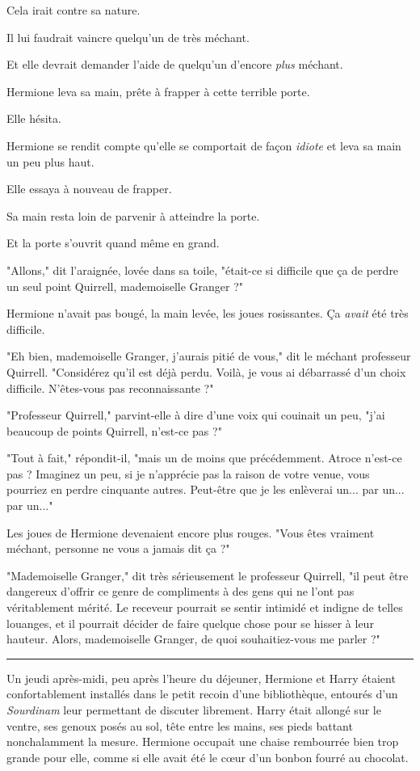 Cela irait contre sa nature.

Il lui faudrait vaincre quelqu'un de très méchant.

Et elle devrait demander l'aide de quelqu'un d'encore \emph{plus}  méchant.

Hermione leva sa main, prête à frapper à cette terrible porte.

Elle hésita.

Hermione se rendit compte qu'elle se comportait de façon \emph{idiote}  et leva sa main un peu plus haut.

Elle essaya à nouveau de frapper.

Sa main resta loin de parvenir à atteindre la porte.

Et la porte s'ouvrit quand même en grand.

"Allons," dit l'araignée, lovée dans sa toile, "était-ce si difficile que ça de perdre un seul point Quirrell, mademoiselle Granger ?"

Hermione n'avait pas bougé, la main levée, les joues rosissantes. Ça \emph{avait}  été très difficile.

"Eh bien, mademoiselle Granger, j'aurais pitié de vous," dit le méchant professeur Quirrell. "Considérez qu'il est déjà perdu. Voilà, je vous ai débarrassé d'un choix difficile. N'êtes-vous pas reconnaissante ?"

"Professeur Quirrell," parvint-elle à dire d'une voix qui couinait un peu, "j'ai beaucoup de points Quirrell, n'est-ce pas ?"

"Tout à fait," répondit-il, "mais un de moins que précédemment. Atroce n'est-ce pas ? Imaginez un peu, si je n'apprécie pas la raison de votre venue, vous pourriez en perdre cinquante autres. Peut-être que je les enlèverai un... par un... par un..."

Les joues de Hermione devenaient encore plus rouges. "Vous êtes vraiment méchant, personne ne vous a jamais dit ça ?"

"Mademoiselle Granger," dit très sérieusement le professeur Quirrell, "il peut être dangereux d'offrir ce genre de compliments à des gens qui ne l'ont pas véritablement mérité. Le receveur pourrait se sentir intimidé et indigne de telles louanges, et il pourrait décider de faire quelque chose pour se hisser à leur hauteur. Alors, mademoiselle Granger, de quoi souhaitiez-vous me parler ?"
\par\noindent\rule{\textwidth}{0.4pt}
Un jeudi après-midi, peu après l'heure du déjeuner, Hermione et Harry étaient confortablement installés dans le petit recoin d'une bibliothèque, entourés d'un \emph{Sourdinam}  leur permettant de discuter librement. Harry était allongé sur le ventre, ses genoux posés au sol, tête entre les mains, ses pieds battant nonchalamment la mesure. Hermione occupait une chaise rembourrée bien trop grande pour elle, comme si elle avait été le cœur d'un bonbon fourré au chocolat.


